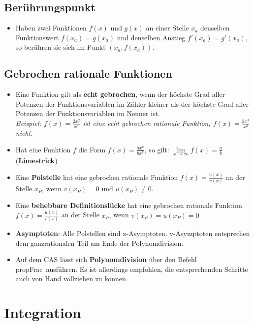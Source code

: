 \subsection{Berührungspunkt}
\begin{itemize}
  \item Haben zwei Funktionen $f(x)$ und $g(x)$ an einer Stelle $x_a$ denselben
  Funktionswert $f(x_a)=g(x_a)$ und denselben Anstieg $f'(x_a)=g'(x_a)$, so
  berühren sie sich im Punkt $(x_a, f(x_a))$.
\end{itemize}

\subsection{Gebrochen rationale Funktionen}
\begin{itemize}
  \item Eine Funktion gilt als \textbf{echt gebrochen}, wenn der höchste Grad
  aller Potenzen der Funktionsvariablen im Zähler kleiner als der höchste Grad
  aller Potenzen der Funktionsvariablen im Nenner ist.\\
  \textit{Beispiel: $f(x) = \frac{2x^2}{x^3}$ ist eine echt gebrochen rationale
  Funktion, $f(x) = \frac{2x^3}{x^2}$ nicht.}

  \item Hat eine Funktion $f$ die Form $f(x) = \frac{ax^k}{bx^k}$, so gilt:
  $\lim\limits_{x \rightarrow \infty} f(x) = \frac{a}{b}$ (\textbf{Limestrick})

  \item Eine \textbf{Polstelle} hat eine gebrochen rationale Funktion
  $f(x) = \frac{u(x)}{v(x)}$ an der Stelle $x_P$,
  wenn $v(x_P) = 0$ und $u(x_P) \neq 0$.

  \item Eine \textbf{behebbare Definitionslücke} hat eine gebrochen rationale Funktion $f(x) = \frac{u(x)}{v(x)}$ an der Stelle $x_P$,
  wenn $v(x_P) = u(x_P) = 0$.

  \item \textbf{Asymptoten}: Alle Polstellen sind x-Asymptoten. y-Asymptoten entsprechen dem ganzrationalen Teil am Ende der Polynomdivision.

  \item Auf dem CAS lässt sich \textbf{Polynomdivision} über den Befehl
  \glqq propFrac\grqq~ausführen. Es ist allerdings empfohlen, die
  entsprechenden Schritte auch von Hand vollziehen zu können.
\end{itemize}

\newpage
\section{Integration}
